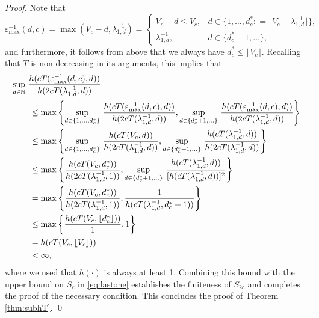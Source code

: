 \documentclass[sort&compress]{elsarticle}
\begin{document}
\begin{proof}
Note that
\[
\varepsilon^{-1}_{\max}(d,c) = \max(V_c - d,\lambda_{1,d}^{-1})
= \begin{cases} V_c - d \le V_c, & d \in \{1, \ldots, d^*_c : = \lfloor V_c - \lambda_{1,d}^{-1} \rfloor\}, \\
\lambda_{1,d}^{-1}, & d \in \{d^*_c+1, \ldots\},
\end{cases}
\]
and furthermore, it follows from above that we always have $d^*_c\le \lfloor V_c \rfloor$.
Recalling that $T$ is non-decreasing in its arguments, this implies that
\begin{align*}
    \MoveEqLeft{\sup_{d\in\naturals} \,
		 \frac{ h(cT(\varepsilon^{-1}_{\max}(d,c),d))}{h(2cT(\lambda_{1,d}^{-1},d))}}\\
  &\le \max \left \{
  \sup_{d \in \{1, \ldots, d^*_c\}} \,
		 \frac{ h(cT(\varepsilon^{-1}_{\max}(d,c),d))}{h(2cT(\lambda_{1,d}^{-1},d))},
  \sup_{d\in \{d^*_c+1, \ldots \}} \,
		 \frac{ h(cT(\varepsilon^{-1}_{\max}(d,c),d))}{h(2cT(\lambda_{1,d}^{-1},d))}
  \right \} \\
  & \le \max \left \{
  \sup_{d \in \{1, \ldots, d^*_c\}}  \,
		 \frac{ h(cT(V_c,d))}{h(2cT(\lambda_{1,d}^{-1},d))}
  ,
  \sup_{d\in \{d^*_c+1, \ldots \}}  \,
		 \frac{ h(cT(\lambda_{1,d}^{-1},d))}{h(2cT(\lambda_{1,d}^{-1},d))}
  \right \}
  \\
  & \le \max \left \{
		 \frac{ h(cT(V_c,d^*_c))}{h(2cT(\lambda_{1,d}^{-1},1))},
  \sup_{d\in \{d^*_c+1, \ldots \}}  \,
		 \frac{ h(cT(\lambda_{1,d}^{-1},d))}{[h(cT(\lambda_{1,d}^{-1},d))]^2}
  \right \} \\
  & = \max \left \{
		 \frac{ h(cT(V_c,d^*_c))}{h(2cT(\lambda_{1,d}^{-1},1))},
		 \frac{1}{h(cT(\lambda_{1,d}^{-1},d_c^*+1))}
  \right \} \\
  & \le \max \left \{
		 \frac{ h(cT(V_c,\lfloor d^*_c \rfloor))}{1},
		 1
  \right \} \\
  & = h(cT(V_c,\lfloor V_c \rfloor))
		  \\
  & < \infty,
\end{align*}
where we used that $h(\cdot)$ is always at least 1. Combining this bound with the upper bound on $S_c$ in \eqref{eq:lastone} establishes the finiteness of $S_{2c}$ and completes the proof of the necessary condition.
This concludes the proof of Theorem \ref{thm:subhT}.
\qed
\end{proof}
\end{document}
